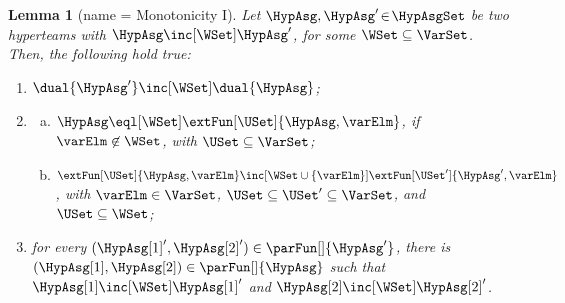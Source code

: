\documentclass[authoryear]{elsarticle}
\newtheorem{lemma}{Lemma}
\begin{document}
\begin{lemma}[name = Monotonicity I]
	\label{lmm:mon}
	Let $\HypAsg, \HypAsg' \!\in\! \HypAsgSet$ be two hyperteams with $\HypAsg
	\inc[\WSet] \HypAsg'$, for some $\WSet \subseteq \VarSet$.
	Then, the following hold true:
	\begin{enumerate}[1)]
		\item\label{lmm:mon(dlt)}
		$\dual{\HypAsg'} \inc[\WSet] \dual{\HypAsg}$;
		\item\label{lmm:mon(ext)}
                  \begin{enumerate}[a)]
                  \item\label{lmm:mon(ext:eql)}
                    $\HypAsg \eql[\WSet] \extFun[\USet]{\HypAsg, \varElm}$, if
                    $\varElm \not\in \WSet$, with $\USet \subseteq \VarSet$;
                  \item\label{lmm:mon(ext:dep)}
                    $\extFun[\USet]{\HypAsg, \varElm} \inc[\WSet \cup \{ \varElm
                    \}] \extFun[\USet']{\HypAsg', \varElm}$, with $\varElm \in
                    \VarSet$, $\USet \subseteq \USet' \subseteq \VarSet$, and
                    $\USet \subseteq \WSet$;
		\end{enumerate}
%
%
		\item\label{lmm:mon(par-unrestricted)} %
		for every $(\HypAsg[1]', \HypAsg[2]') \in \parFun[]{\HypAsg'}$,
		there is $(\HypAsg[1], \HypAsg[2]) \in \parFun[]{\HypAsg}$ such
		that $\HypAsg[1] \inc[\WSet] \HypAsg[1]'$ and $\HypAsg[2] \inc[\WSet]
		\HypAsg[2]'$.
	\end{enumerate}
\end{lemma}
%
\end{document}
